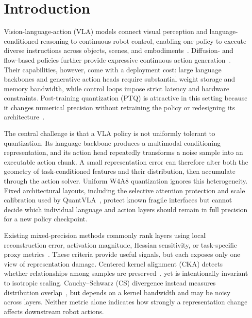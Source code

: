 \section{Introduction}
\label{sec:introduction}

Vision-language-action (VLA) models connect visual perception and language-conditioned reasoning to continuous robot control, enabling one policy to execute diverse instructions across objects, scenes, and embodiments~\cite{brohan2023rt1,driess2023palme,brohan2023rt2,octo2024,kim2024openvla}. Diffusion- and flow-based policies further provide expressive continuous action generation~\cite{chi2023diffusionpolicy,liu2025rdt1b,black2024pi0,intelligence2025pi05,bjorck2025groot}. Their capabilities, however, come with a deployment cost: large language backbones and generative action heads require substantial weight storage and memory bandwidth, while control loops impose strict latency and hardware constraints. Post-training quantization (PTQ) is attractive in this setting because it changes numerical precision without retraining the policy or redesigning its architecture~\cite{xiao2023smoothquant,lin2024duquant}.

The central challenge is that a VLA policy is not uniformly tolerant to quantization. Its language backbone produces a multimodal conditioning representation, and its action head repeatedly transforms a noise sample into an executable action chunk. A small representation error can therefore alter both the geometry of task-conditioned features and their distribution, then accumulate through the action solver. Uniform W4A8 quantization ignores this heterogeneity. Fixed architectural layouts, including the selective attention protection and scale calibration used by QuantVLA~\cite{zhang2026quantvla}, protect known fragile interfaces but cannot decide which individual language and action layers should remain in full precision for a new policy checkpoint.

Existing mixed-precision methods commonly rank layers using local reconstruction error, activation magnitude, Hessian sensitivity, or task-specific proxy metrics~\cite{hubara2021accurate,frantar2022gptq,wang2019hawq,dong2020hawqv2,chen2024qdit,zhao2024mixdq}. These criteria provide useful signals, but each exposes only one view of representation damage. Centered kernel alignment (CKA) detects whether relationships among samples are preserved~\cite{raghu2017svcca,morcos2018pwcca,kornblith2019similarity}, yet is intentionally invariant to isotropic scaling. Cauchy--Schwarz (CS) divergence instead measures distribution overlap~\cite{yin2026csaligner}, but depends on a kernel bandwidth and may be noisy across layers. Neither metric alone indicates how strongly a representation change affects downstream robot actions.

